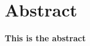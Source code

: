 \documentclass[../main.tex]{subfiles}
\begin{document}
\section*{Abstract}

\textbf{This is the abstract}
\end{document}
